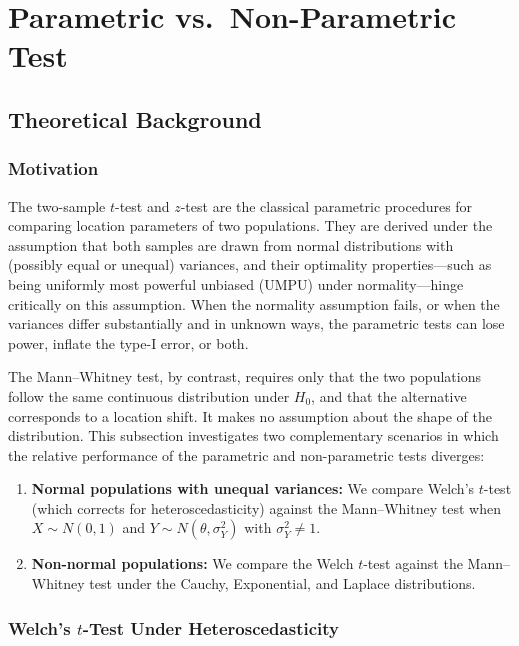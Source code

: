 \documentclass[10pt]{article}
\begin{document}
\section{Parametric vs.\ Non-Parametric Test}

\subsection{Theoretical Background}

\subsubsection{Motivation}

The two-sample $t$-test and $z$-test are the classical parametric procedures for
comparing location parameters of two populations. They are derived under the
assumption that both samples are drawn from normal distributions with (possibly
equal or unequal) variances, and their optimality properties---such as being
uniformly most powerful unbiased (UMPU) under normality---hinge critically on
this assumption. When the normality assumption fails, or when the variances
differ substantially and in unknown ways, the parametric tests can lose power,
inflate the type-I error, or both.

The Mann--Whitney test, by contrast, requires only that the two populations
follow the same continuous distribution under $H_0$, and that the alternative
corresponds to a location shift. It makes no assumption about the shape of the
distribution. This subsection investigates two complementary scenarios in which
the relative performance of the parametric and non-parametric tests diverges:

\begin{enumerate}
  \item \textbf{Normal populations with unequal variances:} We compare Welch's
        $t$-test (which corrects for heteroscedasticity) against the
        Mann--Whitney test when $X \sim N(0,1)$ and $Y \sim N(\theta, \sigma_Y^2)$
        with $\sigma_Y^2 \neq 1$.
  \item \textbf{Non-normal populations:} We compare the Welch $t$-test against
        the Mann--Whitney test under the Cauchy, Exponential, and Laplace
        distributions.
\end{enumerate}

\subsubsection{Welch's $t$-Test Under Heteroscedasticity}
\end{document}
